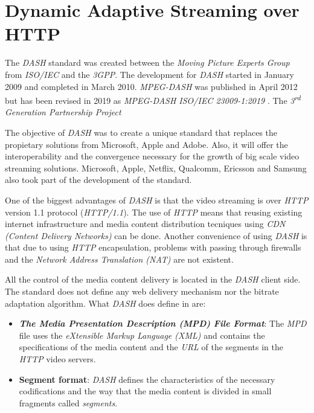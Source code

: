 \section{Dynamic Adaptive Streaming over HTTP}
\label{sec:dash}

The \textit{DASH} standard was created between the \textit{Moving Picture Experts Group} from \textit{ISO/IEC}
and the \textit{3GPP}. The development for \textit{DASH} started in January 2009 and completed in March 2010.
\textit{MPEG-DASH} was published in April 2012 but has been revised in 2019 as \textit{MPEG-DASH ISO/IEC 23009-1:2019}
\cite{ISO23009}. The \textit{3\textsuperscript{rd} Generation Partnership Project}

The objective of \textit{DASH} was to create a unique standard that replaces the propietary solutions
from Microsoft, Apple and Adobe. Also, it will offer the interoperability and the convergence necessary for
the growth of big scale video streaming solutions. Microsoft, Apple, Netflix, Qualcomm,
Ericsson and Samsung also took part of the development of the standard.

One of the biggest advantages of \textit{DASH} is that the video streaming is over \textit{HTTP} version 1.1 protocol
(\textit{HTTP/1.1}). The use of \textit{HTTP} means that reusing existing internet infrastructure and
media content distribution tecniques using \textit{CDN (Content Delivery Networks)} can be done.
Another convenience of using \textit{DASH} is that due to using \textit{HTTP} encapsulation, problems
with passing through firewalls and the \textit{Network Address Translation (NAT)}
are not existent.

All the control of the media content delivery is located in the \textit{DASH} client side. The
standard does not define any web delivery mechanism nor the bitrate adaptation algorithm. What \textit{DASH}
does define in \cite{ISO23009} are:

\begin{itemize}
  \item \textit{\textbf{The Media Presentation Description (MPD) File Format}}: The \textit{MPD} file
  uses the \textit{eXtensible Markup Language (XML)} and
  contains the specifications of the media content and the \textit{URL} of the segments
  in the \textit{HTTP} video servers.
  \item \textbf{Segment format}: \textit{DASH} defines the characteristics of the necessary
  codifications and the way that the media content is divided in small fragments called 
  \textit{segments}.
\end{itemize}



